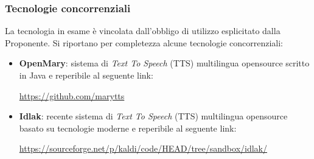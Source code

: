 \documentclass[./../Technology Baseline.tex]{subfiles}
\begin{document}
\subsubsection{Tecnologie concorrenziali}

La tecnologia in esame è vincolata dall'obbligo di utilizzo esplicitato dalla Proponente. Si riportano per completezza alcune tecnologie concorrenziali:

\begin{itemize}
	\item \textbf{OpenMary}: sistema di \textit{Text To Speech} (TTS) multilingua opensource scritto in Java e reperibile al seguente link:
	\begin{center}
		\url{https://github.com/marytts}
	\end{center}
	\item \textbf{Idlak}: recente sistema di \textit{Text To Speech} (TTS) multilingua opensource basato su tecnologie moderne e reperibile al seguente link:
	\begin{center}
	\url{https://sourceforge.net/p/kaldi/code/HEAD/tree/sandbox/idlak/}
	\end{center}
\end{itemize}
\end{document}
